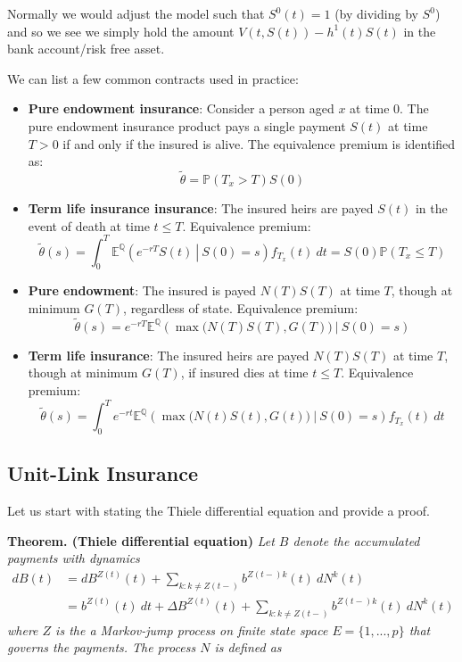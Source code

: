 \documentclass[a4paper,10pt,openany]{book}
\providecommand{\tightlist}{%
 \setlength{\itemsep}{0pt}\setlength{\parskip}{0pt}}
\begin{document}
Normally we would adjust the model such that \(S^0(t)=1\) (by dividing by \(S^0\)) and so we see we simply hold the amount \(V(t,S(t))-h^1(t)S(t)\) in the bank account/risk free asset.

We can list a few common contracts used in practice:

\begin{itemize}
\tightlist
\item
  \textbf{Pure endowment insurance}: Consider a person aged \(x\) at time \(0\). The pure endowment insurance product pays a single payment \(S(t)\) at time \(T>0\) if and only if the insured is alive. The equivalence premium is identified as:
  \[\tilde\theta =\mathbb P(T_x> T)S(0)\]
\item
  \textbf{Term life insurance insurance}: The insured heirs are payed \(S(t)\) in the event of death at time \(t\le T\). Equivalence premium:
  \[\tilde\theta(s) =\int_0^T\mathbb E^{\mathbb Q}\left(\left.e^{-rT}S(t)\ \right\vert\ S(0)=s\right)f_{T_x}(t)\ dt=S(0)\mathbb P(T_x\le T)\]
\item
  \textbf{Pure endowment}: The insured is payed \(N(T)S(T)\) at time \(T\), though at minimum \(G(T)\), regardless of state. Equivalence premium:
  \[\tilde\theta(s) =e^{-rT}\mathbb E^{\mathbb Q}\left(\left.\max\Big(N(T)S(T),G(T)\Big) \ \right\vert\ S(0)=s\right)\]
\item
  \textbf{Term life insurance}: The insured heirs are payed \(N(T)S(T)\) at time \(T\), though at minimum \(G(T)\), if insured dies at time \(t\le T\). Equivalence premium:
  \[\tilde\theta(s) =\int_0^Te^{-rt}\mathbb E^{\mathbb Q}\left(\left.\max\Big(N(t)S(t),G(t)\Big) \ \right\vert\ S(0)=s\right)f_{T_x}(t)\ dt\]
\end{itemize}

\hypertarget{unit-link-insurance}{%
\subsection{Unit-Link Insurance}\label{unit-link-insurance}}

Let us start with stating the Thiele differential equation and provide a proof.

\textbf{Theorem. (Thiele differential equation)} \emph{Let \(B\) denote the accumulated payments with dynamics}
\begin{align*}
dB(t)&=dB^{Z(t)}(t)+\sum_{k:k\ne Z(t-)}b^{Z(t-)k}(t)\ dN^k(t)\\
&=b^{Z(t)}(t)\ dt+\Delta B^{Z(t)}(t)+\sum_{k:k\ne Z(t-)}b^{Z(t-)k}(t)\ dN^k(t)
\end{align*}
\emph{where \(Z\) is the a Markov-jump process on finite state space \(E=\{1,...,p\}\) that governs the payments. The process \(N\) is defined as}
\end{document}
